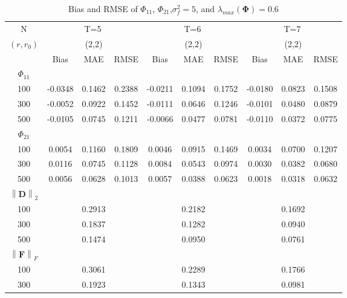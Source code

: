 \documentclass[12pt,a4paper,hyperref]{article}
\begin{document}
\begin{table}[H]
\caption{Bias and RMSE of $\Phi_{11}$, $\Phi_{21}$,$\sigma^{2}_{f}=5$,  and $\lambda_{max}(\boldsymbol{\Phi})=0.6$}
\centering
\tabcolsep=0.11cm
\begin{threeparttable}
\begin{tabular} {*{10}{c}}
\toprule
N& \multicolumn{3}{c}{T=5}&\multicolumn{3}{c}{T=6}&\multicolumn{3}{c}{T=7}\\
\cmidrule(lr){1-10}
$(r,r_{0})$ &   &(2,2)  &  &   &(2,2)  & &  &(2,2) & \\
\cmidrule(lr){1-4} \cmidrule(lr){5-7}\cmidrule(lr){8-10}
& \multicolumn{1}{c}{Bias} &\multicolumn{1}{c}{MAE}& \multicolumn{1}{c}{RMSE}&\multicolumn{1}{c}{Bias} &\multicolumn{1}{c}{MAE}& \multicolumn{1}{c}{RMSE}&\multicolumn{1}{c}{Bias}&\multicolumn{1}{c}{MAE} & \multicolumn{1}{c}{RMSE}\\
  \cmidrule(lr){2-4} \cmidrule(lr){5-7} \cmidrule(lr){8-10}
 $\Phi_{11}$\\
\cmidrule(lr){1-10}
 100& -0.0348& 0.1462& 0.2388& -0.0211 & 0.1094& 0.1752& -0.0180& 0.0823&0.1508\\
300&-0.0052 & 0.0922& 0.1452&-0.0111 & 0.0646&0.1246 & -0.0101&0.0480&0.0879\\
500&-0.0105 & 0.0745&0.1211 &-0.0066  & 0.0477&0.0781 &-0.0110 &0.0372 & 0.0775\\
\cmidrule(lr){1-10}
$\Phi_{21}$\\
\cmidrule(lr){1-4}   \cmidrule(lr){5-7}   \cmidrule(lr){8-10}
100& 0.0054& 0.1160& 0.1809&0.0046  & 0.0915& 0.1469& 0.0034& 0.0700&0.1207\\
300&0.0116 & 0.0745&0.1128&0.0084  & 0.0543&0.0974& 0.0030&0.0382 &0.0680\\
500&0.0056&0.0628 &0.1013& 0.0057&0.0388&0.0623& 0.0018&0.0318&0.0632 \\
\cmidrule(lr){1-10}
$\left\| \boldsymbol{D} \right\|_{2} $\\
\cmidrule(lr){1-4}   \cmidrule(lr){5-7}   \cmidrule(lr){8-10}
100& & 0.2913& &  &0.2182 & & &0.1692& \\
300& &0.1837 & &  & 0.1282& & &0.0940 &\\
500& &0.1474& &  & 0.0950& & & 0.0761& \\
\cmidrule(lr){1-10}
$\left\| \boldsymbol{F} \right\|_{F} $\\
\cmidrule(lr){1-4}   \cmidrule(lr){5-7}   \cmidrule(lr){8-10}
100& &0.3061 & &  & 0.2289& & &0.1766 & \\
300& &0.1923 & &  & 0.1343& & & 0.0981&\\

\end{tabular}
\end{threeparttable}
\end{table}
\end{document}
